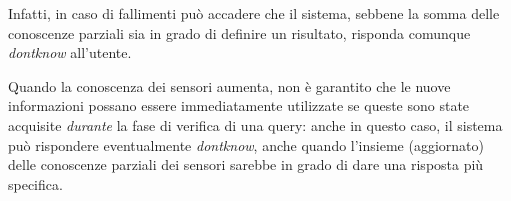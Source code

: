 \documentclass{llncs}
\begin{document}
Infatti,
in caso di fallimenti può accadere che il sistema, sebbene la somma
delle conoscenze parziali sia in grado di definire un risultato,
risponda comunque \emph{dontknow} all'utente.

Quando la conoscenza dei sensori aumenta,
non è garantito che le nuove informazioni possano essere immediatamente
utilizzate se queste sono state acquisite \emph{durante} la fase di verifica
di una query: anche in questo caso, il sistema può rispondere eventualmente
\emph{dontknow}, anche quando l'insieme (aggiornato) delle conoscenze parziali
dei sensori sarebbe in grado di dare una risposta più specifica.

\end{document}
